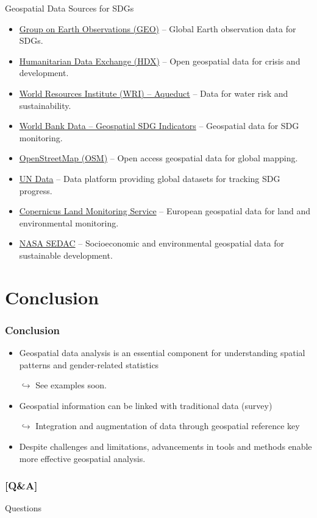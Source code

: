 \documentclass[xcolor=x11names,aspectratio=169, compress]{beamer}
\renewcommand{\(}{\begin{columns}}
\renewcommand{\)}{\end{columns}}
\newcommand{\<}[1]{\begin{column}{#1}}
\renewcommand{\>}{\end{column}}
\begin{document}
\begin{frame}{Geospatial Data Sources for SDGs}
    \begin{itemize}
        \item \href{https://www.earthobservations.org/sdgs.php}{Group on Earth Observations (GEO)} – Global Earth observation data for SDGs.
        \item \href{https://data.humdata.org/}{Humanitarian Data Exchange (HDX)} – Open geospatial data for crisis and development.
        \item \href{https://www.wri.org/data/wrims-water-data-portal}{World Resources Institute (WRI) – Aqueduct} – Data for water risk and sustainability.
        \item \href{https://datacatalog.worldbank.org/search/dataset/0038272}{World Bank Data – Geospatial SDG Indicators} – Geospatial data for SDG monitoring.
        \item \href{https://www.openstreetmap.org}{OpenStreetMap (OSM)} – Open access geospatial data for global mapping.
        \item \href{https://data.un.org/}{UN Data} – Data platform providing global datasets for tracking SDG progress.
        \item \href{https://land.copernicus.eu/}{Copernicus Land Monitoring Service} – European geospatial data for land and environmental monitoring.
        \item \href{https://sedac.ciesin.columbia.edu/}{NASA SEDAC} – Socioeconomic and environmental geospatial data for sustainable development.
    \end{itemize}
\end{frame}

\section{Conclusion}
\begin{frame}
\frametitle{Conclusion}
    \begin{itemize}[<+->]
        \item Geospatial data analysis is an essential component for understanding spatial patterns and gender-related statistics
        \item[$\hookrightarrow$] See examples soon.
        \item Geospatial information can be linked with traditional data (survey)
         \item[$\hookrightarrow$] Integration and augmentation of data through geospatial reference key
        \item Despite challenges and limitations, advancements in tools and methods enable more effective geospatial analysis.
    \end{itemize}
\end{frame}







\begin{frame} %
\frametitle{\textcolor{brique}{[Q\&A]}}
\begin{center}
\Large \textcolor{siap}{ Questions}
\end{center}
\end{frame}
\end{document}
